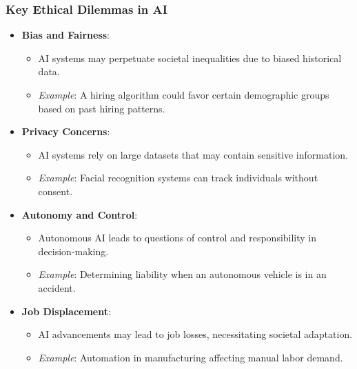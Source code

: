 \documentclass[aspectratio=169]{beamer}
\begin{document}
\begin{frame}[fragile]
    \frametitle{Key Ethical Dilemmas in AI}
    \begin{itemize}
        \item \textbf{Bias and Fairness}:
        \begin{itemize}
            \item AI systems may perpetuate societal inequalities due to biased historical data.
            \item \textit{Example}: A hiring algorithm could favor certain demographic groups based on past hiring patterns.
        \end{itemize}
        
        \item \textbf{Privacy Concerns}:
        \begin{itemize}
            \item AI systems rely on large datasets that may contain sensitive information.
            \item \textit{Example}: Facial recognition systems can track individuals without consent.
        \end{itemize}
        
        \item \textbf{Autonomy and Control}:
        \begin{itemize}
            \item Autonomous AI leads to questions of control and responsibility in decision-making.
            \item \textit{Example}: Determining liability when an autonomous vehicle is in an accident.
        \end{itemize}
        
        \item \textbf{Job Displacement}:
        \begin{itemize}
            \item AI advancements may lead to job losses, necessitating societal adaptation.
            \item \textit{Example}: Automation in manufacturing affecting manual labor demand.
        \end{itemize}
    \end{itemize}
\end{frame}
\end{document}
